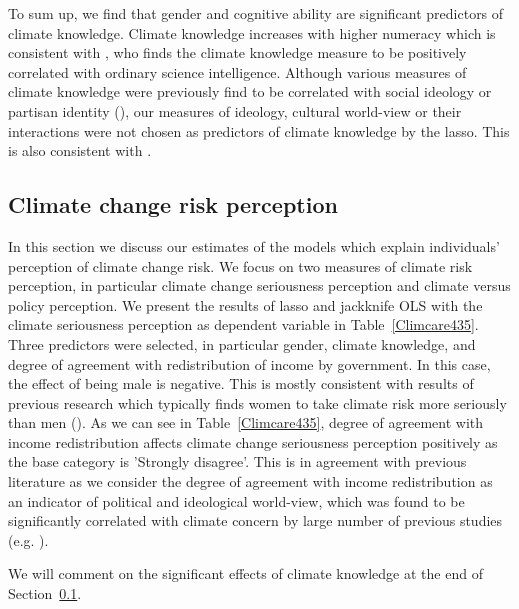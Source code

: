 \documentclass[a4paper,12pt]{article}
\begin{document}
 To sum up, we find that gender and cognitive ability are significant predictors of climate knowledge.  Climate knowledge increases with higher numeracy which is consistent with \citet{Kahan2015}, who finds the climate knowledge measure to be positively correlated with ordinary science intelligence. Although various measures of climate knowledge were previously find to be correlated with social ideology or partisan identity (\citealp{Hamilton2011, Kahan2012, Kellstedt2008}), our measures of ideology, cultural world-view or their interactions were not chosen as predictors of climate knowledge by the lasso. This is also consistent with \citet{Kahan2015}.




\subsection{Climate change risk perception}\label{ResPerc}

In this section we discuss our estimates of the models which explain individuals' perception of climate change risk. We focus on two measures of climate risk perception, in particular climate change seriousness perception and climate versus policy perception. We present the results of lasso and jackknife OLS with the climate seriousness perception as dependent variable in Table~\ref{Climcare435}. Three predictors were selected, in particular gender, climate knowledge, and degree of agreement with redistribution of income by government. In this case, the effect of being male is negative. This is mostly consistent with results of previous research which typically finds women to take climate risk more seriously than men (\citealp{WHITMARSH2011, McCright2010, Kahan2007}). As we can see in Table~\ref{Climcare435}, degree of agreement with income redistribution affects climate change seriousness perception positively as the base category is 'Strongly disagree'. This is in agreement with previous literature as we consider the degree of agreement with income redistribution as an indicator of political and ideological world-view, which was found to be significantly correlated with climate concern by large number of previous studies (e.g. \citealp{Leiserowitz2013, Kahan2012, WHITMARSH2011}). 

We will comment on the significant effects of climate knowledge at the end of Section~\ref{ResPerc}.
\end{document}
